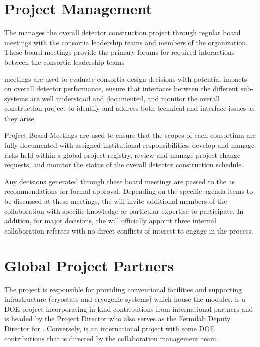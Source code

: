 \section{Project Management}
\label{sec:pm}

The  manages the overall detector construction
project through regular board meetings with the consortia leadership
teams and members of the  organization.  These
board meetings provide the primary forums for required interactions
between the consortia leadership teams

 meetings are used to evaluate consortia design
decisions with potential impacts on overall detector performance,
ensure that interfaces between the different sub-systems are well
understood and documented, and monitor the overall construction
project to identify and address both technical and interface issues as
they arise.

Project Board Meetings are used to ensure that the scopes of each
consortium are fully documented with assigned institutional
responsibilities, develop and manage risks held within a global
project registry, review and manage project change requests, and
monitor the status of the overall detector construction schedule.

Any decisions generated through these board meetings are passed to the
  as recommendations for formal approval.
Depending on the specific agenda items to be discussed at these
meetings, the  will invite additional members of
the collaboration with specific knowledge or particular expertise to
participate.  In addition, for major decisions, the 
will officially appoint three internal collaboration
referees with no direct conflicts of interest to engage in the
process.

\section{Global Project Partners}
\label{sec:partners}

The  project is responsible for providing conventional
facilities and supporting infrastructure (cryostats and cryogenic
systems) which house the   modules.  is a  DOE
project incorporating in-kind contributions from international
partners and is headed by the  Project Director who also serves as
the Fermilab Deputy Director for .  Conversely,  is an
international project with some  DOE contributions that is
directed by the  collaboration management team.

